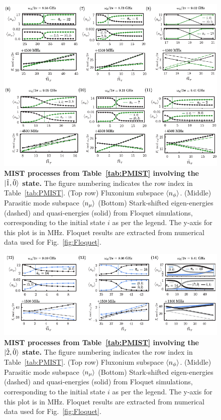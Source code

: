 \documentclass[%
reprint,
superscriptaddress,
 amsmath,amssymb,
 aps,
 prx,
longbibliography,
floatfix,
]{revtex4-2}
\begin{document}
{\begin{figure}
    \centering
    \includegraphics[width=1.0\textwidth]{Supp_Fig/Trans1.pdf}
    \caption{\textbf{MIST processes from Table~\ref{tab:PMIST} involving the $\ket{\tilde{1},\tilde{0}}$ state.} The figure numbering indicates the row index in Table~\ref{tab:PMIST}. (Top row) Fluxonium subspace $\braket{n_\phi}$. (Middle) Parasitic mode subspace $\braket{n_\mu}$ (Bottom) Stark-shifted eigen-energies (dashed) and quasi-energies (solid) from Floquet simulations, corresponding to the initial state $i$ as per the legend. The y-axis for this plot is in MHz. Floquet results are extracted from numerical data used for Fig.~\ref{fig:Floquet}.}
    \label{fig:Trans1}
\end{figure}
\begin{figure}
    \centering
    \includegraphics[width=1.0\textwidth]{Supp_Fig/Trans2.pdf}
    \caption{\textbf{MIST processes from Table~\ref{tab:PMIST} involving the $\ket{\tilde{2},\tilde{0}}$ state.} The figure numbering indicates the row index in Table~\ref{tab:PMIST}. (Top row) Fluxonium subspace $\braket{n_\phi}$. (Middle) Parasitic mode subspace $\braket{n_\mu}$ (Bottom) Stark-shifted eigen-energies (dashed) and quasi-energies (solid) from Floquet simulations, corresponding to the initial state $i$ as per the legend. The y-axis for this plot is in MHz. Floquet results are extracted from numerical data used for Fig.~\ref{fig:Floquet}.}

\end{figure}}
\end{document}
